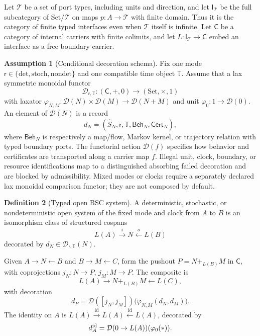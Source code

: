 \documentclass[11pt,a4paper]{article}
\theoremstyle{definition}
\newtheorem{definition}{Definition}[section]
\newtheorem{assumption}[definition]{Assumption}
\theoremstyle{plain}
\theoremstyle{remark}
\newcommand{\Cert}{\mathsf{Cert}}
\newcommand{\Id}{\mathrm{id}}
\begin{document}
Let \(\mathcal T\) be a set of port types, including units and direction, and
let \(\mathsf I_{\mathcal T}\) be the full subcategory of
\(\mathrm{Set}/\mathcal T\) on maps \(p:A\to\mathcal T\) with finite domain.
Thus it is the category of finite typed interfaces even when \(\mathcal T\)
itself is infinite.  Let
\(\mathsf C\) be a category of internal carriers with finite colimits, and let
\(L:\mathsf I_{\mathcal T}\to\mathsf C\) embed an interface as a free boundary
carrier.

\begin{assumption}[Conditional decoration schema]\label{def:decoration}
Fix one mode
\(\mathsf r\in\{\mathrm{det},\mathrm{stoch},\mathrm{nondet}\}\) and one
compatible time object \(\mathbb T\).  Assume that a lax
symmetric monoidal functor
\[
\mathcal D_{\mathsf r,\mathbb T}:
(\mathsf C,+,0)\longrightarrow(\mathrm{Set},\times,1)
\]
with laxator
\(\varphi_{N,M}:\mathcal D(N)\times\mathcal D(M)\to
\mathcal D(N+M)\) and unit \(\varphi_0:1\to\mathcal D(0)\).
An element of \(\mathcal D(N)\) is a record
\[
d_N=(\widehat S_N,\mathsf r,\mathbb T,\mathsf{Beh}_N,\Cert_N),
\]
where \(\mathsf{Beh}_N\) is respectively a map/flow, Markov kernel, or
trajectory relation with typed boundary ports.  The functorial action
\(\mathcal D(f)\) specifies how behavior and certificates are transported
along a carrier map \(f\).  Illegal unit, clock, boundary, or resource
identifications map to a distinguished absorbing failed decoration and are
blocked by admissibility.  Mixed modes or clocks require a separately
declared lax monoidal comparison functor; they are not composed by default.
\end{assumption}

\begin{definition}[Typed open BSC system]\label{def:cospan}
A deterministic, stochastic, or nondeterministic open system of the fixed
mode and clock from \(A\) to \(B\) is an isomorphism class of structured
cospans
\[
L(A)\xrightarrow{i}N\xleftarrow{o}L(B)
\]
decorated by \(d_N\in\mathcal D_{\mathsf r,\mathbb T}(N)\).
\end{definition}

Given \(A\to N\leftarrow B\) and \(B\to M\leftarrow C\), form the pushout
\(P=N+_{L(B)}M\) in \(\mathsf C\), with coprojections
\(j_N:N\to P\), \(j_M:M\to P\).  The composite is
\[
L(A)\longrightarrow N+_{L(B)}M\longleftarrow L(C),
\]
with decoration
\[
d_P
=\mathcal D([j_N,j_M])
\bigl(\varphi_{N,M}(d_N,d_M)\bigr).
\]
The identity on \(A\) is
\(L(A)\xrightarrow{\Id}L(A)\xleftarrow{\Id}L(A)\), decorated by
\[
d_A^{\rm id}
=\mathcal D(0\to L(A))(\varphi_0(*)).
\]
\end{document}
